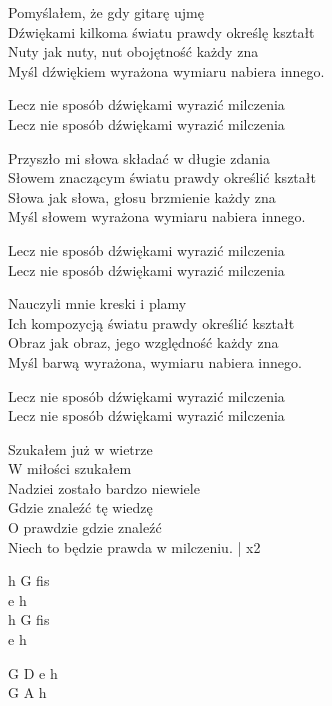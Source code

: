 \begin{text}
    Pomyślałem, że gdy gitarę ujmę\\
    Dźwiękami kilkoma światu prawdy określę kształt\\
    Nuty jak nuty, nut obojętność każdy zna\\
    Myśl dźwiękiem wyrażona wymiaru nabiera innego.

    Lecz nie sposób dźwiękami wyrazić milczenia\\
    Lecz nie sposób dźwiękami wyrazić milczenia

    Przyszło mi słowa składać w długie zdania\\
    Słowem znaczącym światu prawdy określić kształt\\
    Słowa jak słowa, głosu brzmienie każdy zna\\
    Myśl słowem wyrażona wymiaru nabiera innego.

    Lecz nie sposób dźwiękami wyrazić milczenia\\
    Lecz nie sposób dźwiękami wyrazić milczenia

    Nauczyli mnie kreski i plamy\\
    Ich kompozycją światu prawdy określić kształt\\
    Obraz jak obraz, jego względność każdy zna\\
    Myśl barwą wyrażona, wymiaru nabiera innego.

    Lecz nie sposób dźwiękami wyrazić milczenia\\
    Lecz nie sposób dźwiękami wyrazić milczenia

    Szukałem już w wietrze\\
    W miłości szukałem\\
    Nadziei zostało bardzo niewiele\\
    Gdzie znaleźć tę wiedzę\\
    O prawdzie gdzie znaleźć\\
    Niech to będzie prawda w milczeniu. | x2
\end{text}
\begin{chord}
    h G fis\\
    e h\\
    h G fis\\
    e h

    G D e h\\
    G A h
\end{chord}